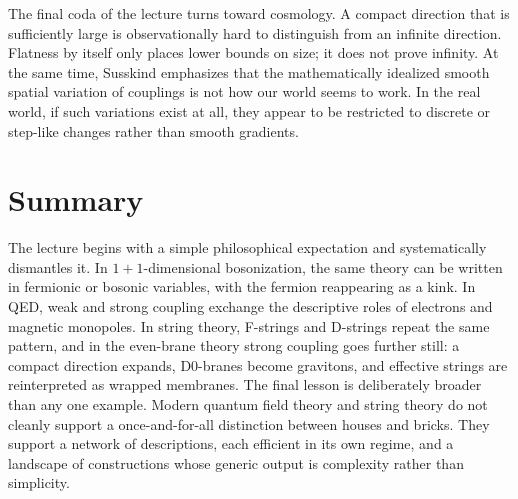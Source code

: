 The final coda of the lecture turns toward cosmology. A compact direction that is sufficiently large is observationally hard to distinguish from an infinite direction. Flatness by itself only places lower bounds on size; it does not prove infinity. At the same time, Susskind emphasizes that the mathematically idealized smooth spatial variation of couplings is not how our world seems to work. In the real world, if such variations exist at all, they appear to be restricted to discrete or step-like changes rather than smooth gradients.

\section{Summary}

The lecture begins with a simple philosophical expectation and systematically dismantles it. In \(1+1\)-dimensional bosonization, the same theory can be written in fermionic or bosonic variables, with the fermion reappearing as a kink. In QED, weak and strong coupling exchange the descriptive roles of electrons and magnetic monopoles. In string theory, F-strings and D-strings repeat the same pattern, and in the even-brane theory strong coupling goes further still: a compact direction expands, D0-branes become gravitons, and effective strings are reinterpreted as wrapped membranes. The final lesson is deliberately broader than any one example. Modern quantum field theory and string theory do not cleanly support a once-and-for-all distinction between houses and bricks. They support a network of descriptions, each efficient in its own regime, and a landscape of constructions whose generic output is complexity rather than simplicity.